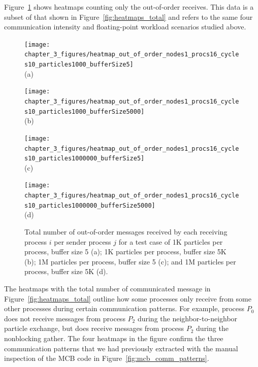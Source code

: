 Figure~\ref{fig:heatmaps_out_of_order} shows heatmaps counting only
the out-of-order receives. This data is a subset of that shown in
Figure~\ref{fig:heatmaps_total} and refers to the same four
communication intensity and floating-point workload scenarios studied
above.
\begin{figure}[ht!]
    \begin{minipage}[b]{0.5\linewidth}
        \centering
        \texttt{[image: chapter\_3\_figures/heatmap\_out\_of\_order\_nodes1\_procs16\_cycles10\_particles1000\_bufferSize5]}
        \\ (a) \\
    \end{minipage}%
    \begin{minipage}[b]{0.5\linewidth}
        \centering
        \texttt{[image: chapter\_3\_figures/heatmap\_out\_of\_order\_nodes1\_procs16\_cycles10\_particles1000\_bufferSize5000]}
       \\ (b) \\
    \end{minipage}
    \begin{minipage}[b]{0.5\linewidth}
        \centering
        \texttt{[image: chapter\_3\_figures/heatmap\_out\_of\_order\_nodes1\_procs16\_cycles10\_particles1000000\_bufferSize5]}
       \\ (c) \\
    \end{minipage}%
    \begin{minipage}[b]{0.5\linewidth}
        \centering
        \texttt{[image: chapter\_3\_figures/heatmap\_out\_of\_order\_nodes1\_procs16\_cycles10\_particles1000000\_bufferSize5000]}
      \\ (d) \\ 
    \end{minipage}
    \caption{Total number of out-of-order messages received by each receiving
      process $i$ per sender process $j$ for a test case of 1K
      particles per process, buffer size 5 (a); 1K particles per
      process, buffer size 5K (b); 1M particles per process, buffer
      size 5 (c); and 1M particles per process, buffer size 5K (d).}
    \label{fig:heatmaps_out_of_order}
\end{figure}

The heatmaps with the total number of communicated message in
Figure~\ref{fig:heatmaps_total} outline how some processes only
receive from some other processes during certain communication
patterns. For example, process $P_0$ does not receive messages from
process $P_2$ during the neighbor-to-neighbor particle exchange, but
does receive messages from process $P_2$ during the nonblocking
gather. The four heatmaps in the figure confirm the three
communication patterns that we had previously extracted with the
manual inspection of the MCB code in
Figure~\ref{fig:mcb_comm_patterns}.

